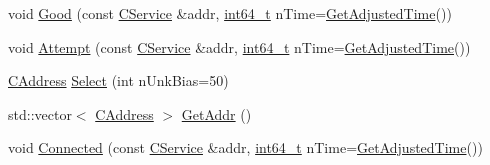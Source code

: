 \begin{DoxyCompactItemize}
void \hyperlink{class_c_addr_man_a993e80e74701d7bc6bb49880c387b847}{Good} (const \hyperlink{class_c_service}{C\+Service} \&addr, \hyperlink{stdint_8h_adec1df1b8b51cb32b77e5b86fff46471}{int64\+\_\+t} n\+Time=\hyperlink{timedata_8h_a09f81b9c7650f898cf3cf305b87547e6}{Get\+Adjusted\+Time}())
\item 
void \hyperlink{class_c_addr_man_afcddc2573121065177dc981cea710789}{Attempt} (const \hyperlink{class_c_service}{C\+Service} \&addr, \hyperlink{stdint_8h_adec1df1b8b51cb32b77e5b86fff46471}{int64\+\_\+t} n\+Time=\hyperlink{timedata_8h_a09f81b9c7650f898cf3cf305b87547e6}{Get\+Adjusted\+Time}())
\item 
\hyperlink{class_c_address}{C\+Address} \hyperlink{class_c_addr_man_a6aa6708d0ee55dba9ec6cefc9811c8e3}{Select} (int n\+Unk\+Bias=50)
\item 
std\+::vector$<$ \hyperlink{class_c_address}{C\+Address} $>$ \hyperlink{class_c_addr_man_a69cc6138e696cf88de60925d26023bf2}{Get\+Addr} ()
\item 
void \hyperlink{class_c_addr_man_a7aba66d9e9527522fed974567d34c322}{Connected} (const \hyperlink{class_c_service}{C\+Service} \&addr, \hyperlink{stdint_8h_adec1df1b8b51cb32b77e5b86fff46471}{int64\+\_\+t} n\+Time=\hyperlink{timedata_8h_a09f81b9c7650f898cf3cf305b87547e6}{Get\+Adjusted\+Time}())
\end{DoxyCompactItemize}

